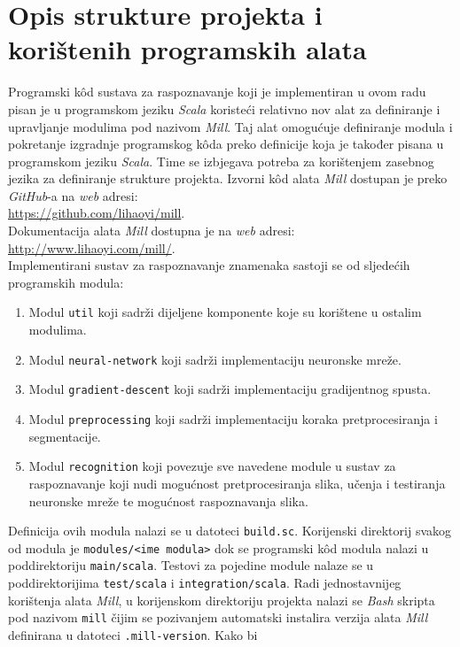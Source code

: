 \chapter{Opis strukture projekta i korištenih programskih alata}
\label{ch:opis-strukture-projekta-i-koristenih-programskih-alata}
Programski kôd sustava za raspoznavanje koji je implementiran u ovom radu pisan je u programskom jeziku \emph{Scala}
koristeći relativno nov alat za definiranje i upravljanje modulima pod nazivom \emph{Mill}. Taj alat omogućuje
definiranje modula i pokretanje izgradnje programskog kôda preko definicije koja je također pisana u programskom jeziku
\emph{Scala}. Time se izbjegava potreba za korištenjem zasebnog jezika za definiranje strukture projekta. Izvorni kôd
alata \emph{Mill} dostupan je preko \emph{GitHub}-a na \emph{web} adresi:\\
\url{https://github.com/lihaoyi/mill}.\\
Dokumentacija alata \emph{Mill} dostupna je na \emph{web} adresi:\\
\url{http://www.lihaoyi.com/mill/}.\\
Implementirani sustav za raspoznavanje znamenaka sastoji se od sljedećih programskih modula:
\begin{enumerate}
    \item Modul \texttt{util} koji sadrži dijeljene komponente koje su korištene u ostalim modulima.
    \item Modul \texttt{neural-network} koji sadrži implementaciju neuronske mreže.
    \item Modul \texttt{gradient-descent} koji sadrži implementaciju gradijentnog spusta.
    \item Modul \texttt{preprocessing} koji sadrži implementaciju koraka pretprocesiranja i segmentacije.
    \item Modul \texttt{recognition} koji povezuje sve navedene module u sustav za raspoznavanje koji nudi mogućnost
    pretprocesiranja slika, učenja i testiranja neuronske mreže te mogućnost raspoznavanja slika.
\end{enumerate}
Definicija ovih modula nalazi se u datoteci \texttt{build.sc}. Korijenski direktorij svakog od modula je
\texttt{modules/<ime modula>} dok se programski kôd modula nalazi u poddirektoriju \texttt{main/scala}. Testovi za
pojedine module nalaze se u poddirektorijima \texttt{test/scala} i \texttt{integration/scala}. Radi jednostavnijeg
korištenja alata \emph{Mill}, u korijenskom direktoriju projekta nalazi se \emph{Bash} skripta pod nazivom \texttt{mill}
čijim se pozivanjem automatski instalira verzija alata \emph{Mill} definirana u datoteci \texttt{.mill-version}. Kako bi
